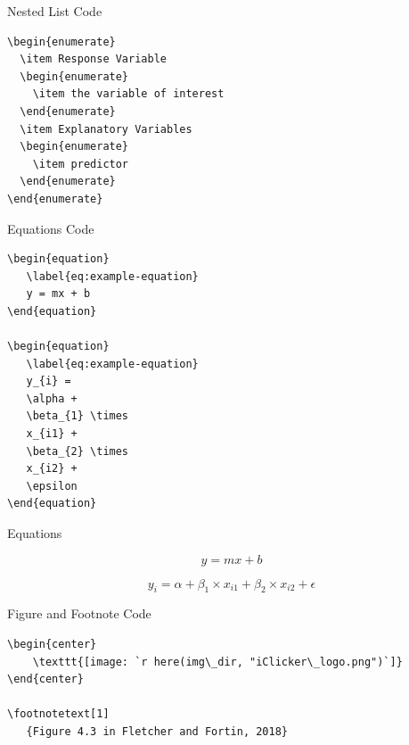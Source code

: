 \documentclass[
  ignorenonframetext,
]{beamer}
\begin{document}
\begin{frame}[fragile]{Nested List Code}
\protect\hypertarget{nested-list-code}{}

\begin{verbatim}
\begin{enumerate}
  \item Response Variable
  \begin{enumerate}
    \item the variable of interest
  \end{enumerate}
  \item Explanatory Variables
  \begin{enumerate}
    \item predictor
  \end{enumerate}
\end{enumerate}
\end{verbatim}

\end{frame}

\begin{frame}[fragile]{Equations Code}
\protect\hypertarget{equations-code}{}

\begin{verbatim}
\begin{equation}
   \label{eq:example-equation}
   y = mx + b
\end{equation}

\begin{equation}
   \label{eq:example-equation}
   y_{i} = 
   \alpha + 
   \beta_{1} \times 
   x_{i1} + 
   \beta_{2} \times 
   x_{i2} + 
   \epsilon
\end{equation}
\end{verbatim}

\end{frame}

\begin{frame}{Equations}
\protect\hypertarget{equations}{}

\begin{equation}
   \label{eq:example-equation}
   y = mx + b
\end{equation}

\begin{equation}
   \label{eq:example-equation}
   y_{i} = \alpha + \beta_{1} \times x_{i1} + \beta_{2} \times x_{i2} + \epsilon
\end{equation}

\end{frame}

\begin{frame}[fragile]{Figure and Footnote Code}
\protect\hypertarget{figure-and-footnote-code}{}

\begin{verbatim}
\begin{center}
    \texttt{[image: `r here(img\_dir, "iClicker\_logo.png")`]}
\end{center}

\footnotetext[1]
   {Figure 4.3 in Fletcher and Fortin, 2018}
\end{verbatim}

\end{frame}
\end{document}
